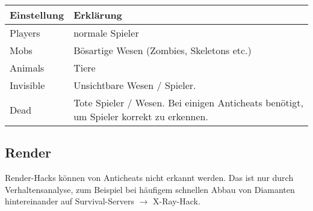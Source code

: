 \begin{longtable}{p{3cm}|p{10cm}}
\textbf{Einstellung} & \textbf{Erklärung} \\
\hline
Players & normale Spieler \\
\hline
Mobs & Bösartige Wesen (Zombies, Skeletons etc.) \\
\hline
Animals & Tiere \\
\hline
Invisible & Unsichtbare Wesen / Spieler. \\
\hline
Dead & Tote Spieler / Wesen. Bei einigen Anticheats benötigt, um Spieler korrekt zu erkennen. \\
\end{longtable}

\subsection{Render}

Render-Hacks können von Anticheats nicht erkannt werden. Das ist nur durch Verhaltensanalyse, zum Beispiel bei häufigem schnellen Abbau von Diamanten hintereinander auf Survival-Servers $\to$ X-Ray-Hack.

